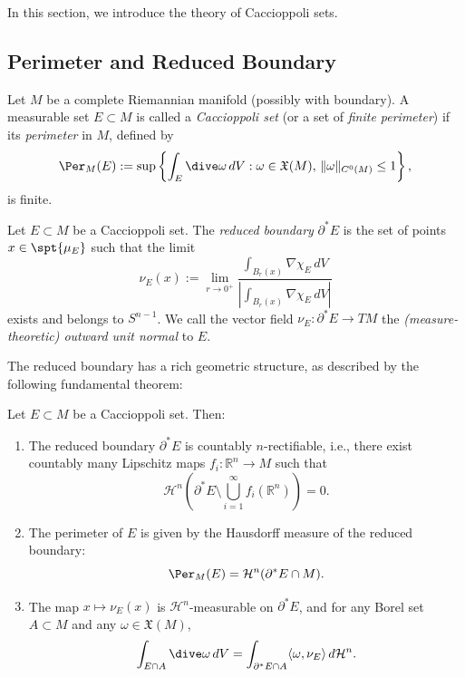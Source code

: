 In this section, we introduce the theory of Caccioppoli sets.

\subsection{Perimeter and Reduced Boundary}\label{subsec:perimeter}
\begin{definition}\label{def:caccioppoli} Let $M$ be a complete Riemannian manifold (possibly with boundary). A measurable set $E \subset M$ is
called a \emph{Caccioppoli set} (or a set of \emph{finite perimeter}) if its \emph{perimeter} in $M$,
defined by
\begin{equation*}
    \Per_M(E) := \sup\left\{ \int_E \dive \omega\, dV : \omega \in \mathfrak{X}(M),\, \|\omega\|_{C^0(M)} \leq 1 \right\},
\end{equation*}
is finite.
\end{definition}

\begin{definition}\label{def:reduced-boundary}
Let $E \subset M$ be a Caccioppoli set. The \emph{reduced boundary} $\partial^* E$ is the set of points $x \in \spt{\mu_E}$ such that the limit 
\begin{equation*}
    \nu_E(x) := \lim_{r \to 0^+} \frac{\int_{B_r(x)} \nabla \chi_E\, dV}{|\int_{B_r(x)} \nabla \chi_E\, dV|}
\end{equation*}
exists and belongs to $S^{n - 1}$. We call the vector field $\nu_E : \partial^* E \to TM$ the \emph{(measure-theoretic) outward unit normal} to $E$.
\end{definition}

The reduced boundary has a rich geometric structure, as described by the following fundamental theorem:

\begin{theorem}\label{thm:structure-reduced-boundary}
Let $E \subset M$ be a Caccioppoli set. Then:
\begin{enumerate}[label=(\roman*)]
    \item The reduced boundary $\partial^* E$ is countably $n$-rectifiable, i.e., there exist countably
    many Lipschitz maps $f_i : \mathbb{R}^n \to M$ such that
    \[
        \mathcal{H}^n\left( \partial^* E \setminus \bigcup_{i=1}^\infty f_i(\mathbb{R}^n) \right) = 0.
    \]
    \item The perimeter of $E$ is given by the Hausdorff measure of the reduced boundary:
    \[
        \Per_M(E) = \mathcal{H}^n(\partial^* E \cap M).
    \]
    \item The map $x \mapsto \nu_E(x)$ is $\mathcal{H}^n$-measurable on $\partial^* E$, and for any
    Borel set $A \subset M$ and any $\omega \in \mathfrak{X}(M)$,
    \[
        \int_{E \cap A} \dive \omega\, dV = \int_{\partial^* E \cap A} \langle \omega, \nu_E \rangle\, d\mathcal{H}^n.
    \]
\end{enumerate}
\end{theorem}

